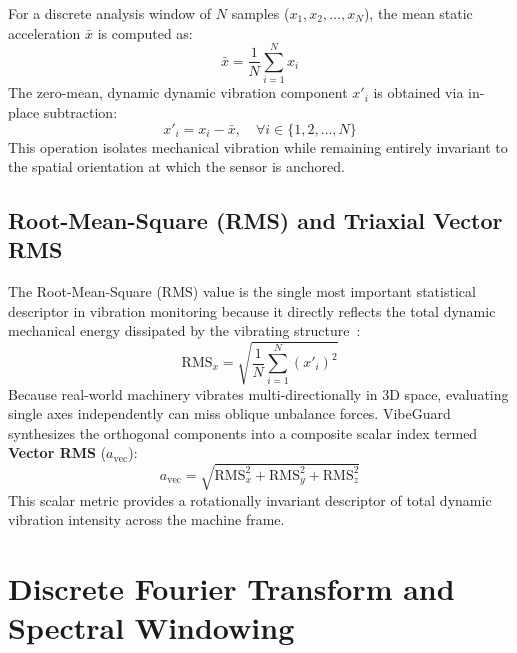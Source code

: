 For a discrete analysis window of $N$ samples ($x_1, x_2, \dots, x_N$), the mean static acceleration $\bar{x}$ is computed as:
\begin{equation}
\bar{x} = \frac{1}{N} \sum_{i=1}^{N} x_i
\label{eq:mean_removal}
\end{equation}
The zero-mean, dynamic dynamic vibration component $x'_i$ is obtained via in-place subtraction:
\begin{equation}
x'_i = x_i - \bar{x}, \quad \forall i \in \{1, 2, \dots, N\}
\label{eq:dc_subtraction}
\end{equation}
This operation isolates mechanical vibration while remaining entirely invariant to the spatial orientation at which the sensor is anchored.

\subsection{Root-Mean-Square (RMS) and Triaxial Vector RMS}
The Root-Mean-Square (RMS) value is the single most important statistical descriptor in vibration monitoring because it directly reflects the total dynamic mechanical energy dissipated by the vibrating structure~\cite{randall2011vibration}:
\begin{equation}
\mathrm{RMS}_x = \sqrt{\frac{1}{N} \sum_{i=1}^{N} (x'_i)^2}
\label{eq:rms_single}
\end{equation}
Because real-world machinery vibrates multi-directionally in 3D space, evaluating single axes independently can miss oblique unbalance forces. VibeGuard synthesizes the orthogonal components into a composite scalar index termed \textbf{Vector RMS} ($a_{\mathrm{vec}}$):
\begin{equation}
a_{\mathrm{vec}} = \sqrt{\mathrm{RMS}_x^2 + \mathrm{RMS}_y^2 + \mathrm{RMS}_z^2}
\label{eq:vector_rms}
\end{equation}
This scalar metric provides a rotationally invariant descriptor of total dynamic vibration intensity across the machine frame.

\section{Discrete Fourier Transform and Spectral Windowing}
